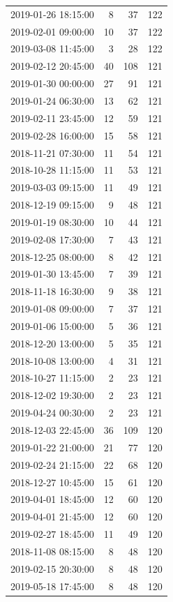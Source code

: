 \begin{tabular}{lrrr}
2019-01-26 18:15:00 & 8 & 37 & 122 \\
2019-02-01 09:00:00 & 10 & 37 & 122 \\
2019-03-08 11:45:00 & 3 & 28 & 122 \\
2019-02-12 20:45:00 & 40 & 108 & 121 \\
2019-01-30 00:00:00 & 27 & 91 & 121 \\
2019-01-24 06:30:00 & 13 & 62 & 121 \\
2019-02-11 23:45:00 & 12 & 59 & 121 \\
2019-02-28 16:00:00 & 15 & 58 & 121 \\
2018-11-21 07:30:00 & 11 & 54 & 121 \\
2018-10-28 11:15:00 & 11 & 53 & 121 \\
2019-03-03 09:15:00 & 11 & 49 & 121 \\
2018-12-19 09:15:00 & 9 & 48 & 121 \\
2019-01-19 08:30:00 & 10 & 44 & 121 \\
2019-02-08 17:30:00 & 7 & 43 & 121 \\
2018-12-25 08:00:00 & 8 & 42 & 121 \\
2019-01-30 13:45:00 & 7 & 39 & 121 \\
2018-11-18 16:30:00 & 9 & 38 & 121 \\
2019-01-08 09:00:00 & 7 & 37 & 121 \\
2019-01-06 15:00:00 & 5 & 36 & 121 \\
2018-12-20 13:00:00 & 5 & 35 & 121 \\
2018-10-08 13:00:00 & 4 & 31 & 121 \\
2018-10-27 11:15:00 & 2 & 23 & 121 \\
2018-12-02 19:30:00 & 2 & 23 & 121 \\
2019-04-24 00:30:00 & 2 & 23 & 121 \\
2018-12-03 22:45:00 & 36 & 109 & 120 \\
2019-01-22 21:00:00 & 21 & 77 & 120 \\
2019-02-24 21:15:00 & 22 & 68 & 120 \\
2018-12-27 10:45:00 & 15 & 61 & 120 \\
2019-04-01 18:45:00 & 12 & 60 & 120 \\
2019-04-01 21:45:00 & 12 & 60 & 120 \\
2019-02-27 18:45:00 & 11 & 49 & 120 \\
2018-11-08 08:15:00 & 8 & 48 & 120 \\
2019-02-15 20:30:00 & 8 & 48 & 120 \\
2019-05-18 17:45:00 & 8 & 48 & 120 \\

\end{tabular}
